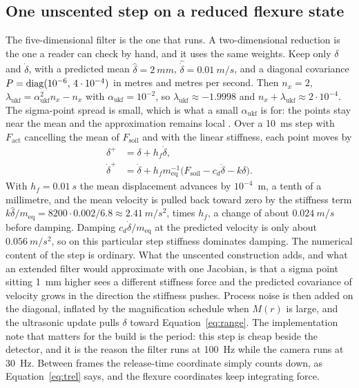 \subsection{One unscented step on a reduced flexure state}

The five-dimensional filter is the one that runs. A two-dimensional reduction is the one a reader can check by hand, and it uses the same weights. Keep only \(\delta\) and \(\dot{\delta}\), with a predicted mean \(\hat{\delta}=\SI{2}{mm}\), \(\hat{\dot{\delta}}=\SI{0.01}{m/s}\), and a diagonal covariance \(P=\operatorname{diag}(10^{-6},\, 4\cdot 10^{-4})\) in metres and metres per second. Then \(n_x=2\), \(\lambda_{\mathrm{ukf}}=\alpha_{\mathrm{ukf}}^2 n_x - n_x\) with \(\alpha_{\mathrm{ukf}}=10^{-2}\), so \(\lambda_{\mathrm{ukf}}\approx -1.9998\) and \(n_x+\lambda_{\mathrm{ukf}}\approx 2\cdot 10^{-4}\). The sigma-point spread is small, which is what a small \(\alpha_{\mathrm{ukf}}\) is for: the points stay near the mean and the approximation remains local \cite{julier1997}. Over a \SI{10}{ms} step with \(F_{\mathrm{act}}\) cancelling the mean of \(F_{\mathrm{soil}}\) and with the linear stiffness, each point moves by
\begin{equation}
\label{eq:euler}
\begin{aligned}
\delta^{+} &= \delta + h_f \dot{\delta},\\
\dot{\delta}^{+} &= \dot{\delta} + h_f m_{\mathrm{eq}}^{-1}\bigl(F_{\mathrm{soil}}-c_d\dot{\delta}-k\delta\bigr).
\end{aligned}
\end{equation}
With \(h_f=\SI{0.01}{s}\) the mean displacement advances by \(10^{-4}\)~m, a tenth of a millimetre, and the mean velocity is pulled back toward zero by the stiffness term \(k\hat{\delta}/m_{\mathrm{eq}} = 8200\cdot 0.002/6.8 \approx \SI{2.41}{m/s^2}\), times \(h_f\), a change of about \(\SI{0.024}{m/s}\) before damping. Damping \(c_d\dot{\delta}/m_{\mathrm{eq}}\) at the predicted velocity is only about \(\SI{0.056}{m/s^2}\), so on this particular step stiffness dominates damping. The numerical content of the step is ordinary. What the unscented construction adds, and what an extended filter would approximate with one Jacobian, is that a sigma point sitting \SI{1}{mm} higher sees a different stiffness force and the predicted covariance of velocity grows in the direction the stiffness pushes. Process noise is then added on the diagonal, inflated by the magnification schedule when \(M(r)\) is large, and the ultrasonic update pulls \(\delta\) toward Equation~\eqref{eq:range}. The implementation note that matters for the build is the period: this step is cheap beside the detector, and it is the reason the filter runs at \SI{100}{Hz} while the camera runs at \SI{30}{Hz}. Between frames the release-time coordinate simply counts down, as Equation~\eqref{eq:trel} says, and the flexure coordinates keep integrating force.

